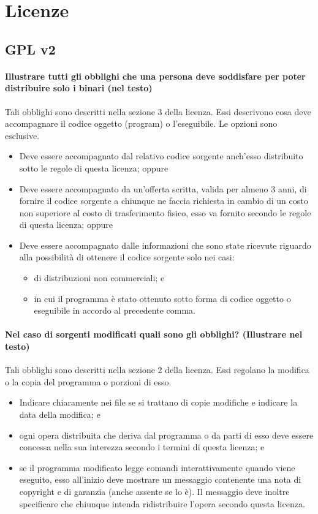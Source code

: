 \documentclass[a4paper]{article}
\begin{document}
		
	\section{Licenze}
	
		\subsection{GPL v2}
		
			\paragraph{Illustrare tutti gli obblighi che una persona deve soddisfare per poter distribuire solo i binari (nel testo)}
			Tali obblighi sono descritti nella sezione 3 della licenza. Essi descrivono cosa deve accompagnare il codice oggetto (program) o l'eseguibile. Le opzioni sono esclusive.
			\begin{itemize}
				\item Deve essere accompagnato dal relativo codice sorgente anch'esso distribuito sotto le regole di questa licenza; oppure
				\item Deve essere accompagnato da un'offerta scritta, valida per almeno 3 anni, di fornire il codice sorgente a chiunque ne faccia richiesta in cambio di un costo non superiore al costo di trasferimento fisico, esso va fornito secondo le regole di questa licenza; oppure
				\item Deve essere accompagnato dalle informazioni che sono state ricevute riguardo alla possibilità di ottenere il codice sorgente solo nei casi:
				\begin{itemize}
					\item di distribuzioni non commerciali; e
					\item in cui il programma è stato ottenuto sotto forma di codice oggetto o eseguibile in accordo al precedente comma.
				\end{itemize}
			\end{itemize}
		
			\paragraph{Nel caso di sorgenti modificati quali sono gli obblighi? (Illustrare nel testo)}
				Tali obblighi sono descritti nella sezione 2 della licenza. Essi regolano la modifica o la copia del programma o porzioni di esso.
				\begin{itemize}
					\item Indicare chiaramente nei file se si trattano di copie modifiche e indicare la data della modifica; e
					\item ogni opera distribuita che deriva dal programma o da parti di esso deve essere concessa nella sua interezza secondo i termini di questa licenza; e
					\item se il programma modificato legge comandi interattivamente quando viene eseguito, esso all'inizio deve mostrare un messaggio contenente una nota di copyright e di garanzia (anche assente se lo è). Il messaggio deve inoltre specificare che chiunque intenda ridistribuire l'opera secondo questa licenza.
				\end{itemize}
		
\end{document}
